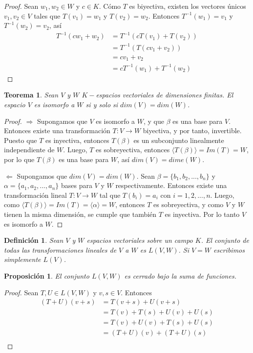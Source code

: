 \documentclass{book}
\newtheorem{theorem}{Teorema}
\newtheorem{proposition}{Proposición}
\newtheorem{definition}{Definición}
\begin{document}
\begin{proof}
Sean $w_1,w_2 \in W$ y $c\in K$. Cómo $T$ es biyectiva, existen los vectores únicos $v_1,v_2 \in V$ tales que $T(v_1)=w_1$ y $T(v_2)=w_2$. Entonces $T^{-1}(w_1)=v_1$ y $T^{-1}(w_2)=v_2$, así
\[
\begin{split}
T^{-1}(cw_1+w_2) &= T^{-1}(cT(v_1)+T(v_2)) \\
&= T^{-1}(T(cv_1+v_2)) \\
&= cv_1+v_2 \\
&= cT^{-1}(w_1)+T^{-1}(w_2)
\end{split}
\]
\end{proof}

\begin{theorem}
Sean $V$ y $W$ $K-$espacios vectoriales de dimensiones finitas. El espacio $V$ es isomorfo a $W$ si y solo si $dim(V)=dim(W)$.
\end{theorem}

\begin{proof}
$\Rightarrow$ Supongamos que $V$ es isomorfo a $W$, y que $\beta$ es una base para $V$. Entonces existe una transformación $T:V\rightarrow W$ biyectiva, y por tanto, invertible. Puesto que $T$ es inyectiva, entonces $T(\beta)$ es un subconjunto linealmente independiente de $W$. Luego, $T$ es sobreyectiva, entonces $\langle T(\beta)\rangle =Im(T)=W$, por lo que $T(\beta)$ es una base para $W$, así $dim(V)=dime(W)$.

$\Leftarrow$ Supongamos que $dim(V)=dim(W)$. Sean $\beta=\{b_1,b_2,...,b_n\}$ y  
$\alpha=\{a_1,a_2,...,a_n\}$ bases para $V$ y $W$ respectivamente. Entonces existe una transformación lineal $T:V\rightarrow W$ tal que $T(b_i)=a_i$ con $i=1,2,...,n$. Luego, como $\langle T(\beta)\rangle =Im(T)=\langle \alpha\rangle =W$, entonces $T$ es sobreyectiva, y como $V$ y $W$ tienen la misma dimensión, se cumple que también $T$ es inyectiva. Por lo tanto $V$ es isomorfo a $W$.
\end{proof}

\begin{definition}
Sean $V$ y $W$ espacios vectoriales sobre un campo $K$. El conjunto de todas las transformaciones lineales de $V$ a $W$ es $L(V,W)$. Si $V=W$ escribimos simplemente $L(V)$.
\end{definition}

\begin{proposition}
El conjunto $L(V,W)$ es cerrado bajo la suma de funciones.
\end{proposition}

\begin{proof}
Sean $T,U \in L(V,W)$ y $v,s \in V$. Entonces
\[
\begin{split}
(T+U)(v+s) &= T(v+s)+U(v+s) \\
&=T(v)+T(s)+U(v)+U(s) \\
&=T(v)+U(v)+T(s)+U(s) \\
&=(T+U)(v)+(T+U)(s) \\
\end{split}
\]
\end{proof}
\end{document}
